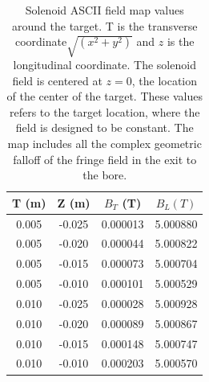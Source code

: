 \begin{table}[h]
	\begin{center}
		\begin{tabular}{| c | c | c | c |}
			\hline \hline
			T (m)  & Z (m) &  $B_T$ (T) & $ B_L (T)$ \\
			\hline
          0.005  &  -0.025 & 0.000013  & 5.000880 \\
          0.005  &  -0.020 & 0.000044  & 5.000822 \\
          0.005  &  -0.015 & 0.000073  & 5.000704 \\
          0.005  &  -0.010 & 0.000101  & 5.000529 \\
          0.010  &  -0.025 & 0.000028  & 5.000928 \\
          0.010  &  -0.020 & 0.000089  & 5.000867 \\
          0.010  &  -0.015 & 0.000148  & 5.000747 \\
          0.010  &  -0.010 & 0.000203  & 5.000570 \\
		\hline \hline
		\end{tabular}
	\end{center}
\caption{Solenoid ASCII field map values around the target. T is the transverse coordinate$\sqrt{(x^2+y^2)}$ and
         $z$ is the longitudinal coordinate.
		 The solenoid field is centered at $z=0$, the location of the center of the target.
         These values refers to the target location, where the field is designed to be constant.
         The map includes all the complex geometric falloff of the fringe field in the exit to the bore.}\label{tab:solMap}
\end{table}

